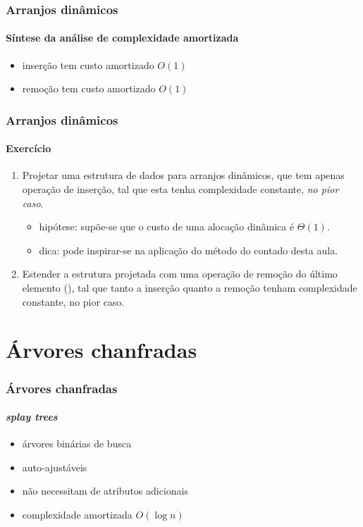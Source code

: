 \documentclass{beamer}
\begin{document}
\begin{frame}
\frametitle{Arranjos dinâmicos}
\framesubtitle{Síntese da análise de complexidade amortizada}
\begin{itemize}
  \item inserção tem custo amortizado $O(1)$
  \item remoção tem custo amortizado $O(1)$
\end{itemize}
\end{frame}

\begin{frame}
\frametitle{Arranjos dinâmicos}
\framesubtitle{Exercício}

\begin{enumerate}
\item Projetar uma estrutura de dados para arranjos dinâmicos, que tem apenas
  operação de inserção, tal que esta tenha complexidade constante, \emph{no pior
    caso}.
  \begin{itemize}
  \item hipótese: supõe-se que o custo de uma alocação dinâmica é $\Theta(1)$.
  \item dica: pode inspirar-se na aplicação do método do contado desta aula.
  \end{itemize}
\item Estender a estrutura projetada com uma operação de remoção do último
  elemento (), tal que tanto a inserção quanto a remoção
  tenham complexidade constante, no pior caso.
\end{enumerate}

\end{frame}

\section{Árvores chanfradas}

\begin{frame}
\frametitle{Árvores chanfradas}
\framesubtitle{\it splay trees}

\begin{itemize}
\item árvores binárias de busca
\item auto-ajustáveis
\item não necessitam de atributos adicionais
\item complexidade amortizada $O(\log n)$
\end{itemize}
\end{frame}
\end{document}
